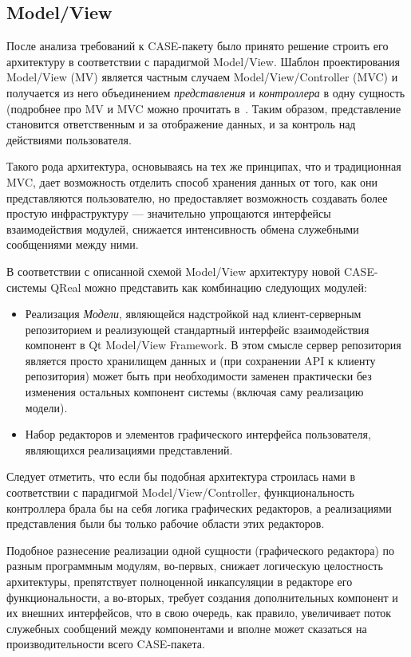 \documentclass[a5paper]{article}
\begin{document}
\subsection{Model/View}

После анализа требований к CASE-пакету было принято решение строить его
архитектуру в соответствии с парадигмой Model/View.
Шаблон проектирования Model/View (MV) является частным случаем
Model/View/Controller (MVC) и получается из него объединением
\textit{представления} и \textit{контроллера} в одну сущность
(подробнее про MV и MVC можно прочитать в~\cite{somethingAboutMvAndMvc}. Таким образом,
представление становится ответственным и за отображение данных, и за
контроль над действиями пользователя.

Такого рода архитектура, основываясь на тех же принципах, что и
традиционная MVC, дает возможность отделить способ хранения данных от
того, как они представляются пользователю, но предоставляет возможность
создавать более простую инфраструктуру --- значительно упрощаются
интерфейсы взаимодействия модулей, снижается интенсивность обмена
служебными сообщениями между ними.

В соответствии с описанной схемой Model/View архитектуру новой
CASE-системы QReal можно представить как комбинацию следующих модулей:

\begin{itemize}
  \item Реализация \textit{Модели}, являющейся надстройкой над
        клиент-серверным репозиторием и реализующей стандартный интерфейс
        взаимодействия компонент в Qt Model/View Framework. В этом смысле
        сервер репозитория является просто хранилищем данных и (при сохранении
        API к клиенту репозитория) может быть при
        необходимости заменен практически без изменения остальных компонент
        системы (включая саму реализацию модели).
  \item
        Набор редакторов и элементов графического интерфейса пользователя,
        являющихся реализациями представлений.
\end{itemize}

Следует отметить, что если бы подобная архитектура строилась нами в
соответствии с парадигмой Model/View/Controller,
функциональность контроллера брала бы на себя логика графических
редакторов, а реализациями представления были бы только рабочие области
этих редакторов.

Подобное разнесение реализации одной сущности (графического редактора)
по разным программным модулям, во-первых, снижает логическую
целостность архитектуры, препятствует полноценной инкапсуляции в
редакторе его функциональности, а во-вторых, требует создания
дополнительных компонент и их внешних интерфейсов, что в свою очередь,
как правило, увеличивает поток служебных сообщений между компонентами и
вполне может сказаться на производительности всего
CASE-пакета.
\end{document}
